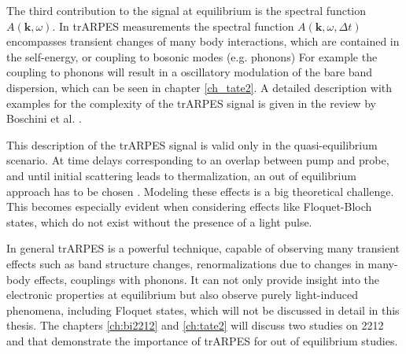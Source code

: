 The third contribution to the signal at equilibrium is the spectral function $A(\mathbf{k}, \omega)$.
In trARPES measurements the spectral function $A(\mathbf{k}, \omega, \Delta t)$ encompasses transient changes of many body interactions, which are contained in the self-energy, or coupling to bosonic modes (e.g. phonons)
For example the coupling to phonons will result in a oscillatory modulation of the bare band dispersion, which can be seen in chapter \ref{ch_tate2}.
A detailed description with examples for the complexity of the trARPES signal is given in the review by Boschini et al. \cite{boschini_time-resolved_2024}.

This description of the trARPES signal is valid only in the quasi-equilibrium scenario.
At time delays corresponding to an overlap between pump and probe, and until initial scattering leads to thermalization, an out of equilibrium approach has to be chosen \cite{schuler_theory_2021, freericks_what_2021,neufeld_time-_2022}.
Modeling these effects is a big theoretical challenge.
This becomes especially evident when considering effects like Floquet-Bloch states, which do not exist without the presence of a light pulse.

In general trARPES is a powerful technique, capable of observing many transient effects such as band structure changes, renormalizations due to changes in many-body effects, couplings with phonons.
It can not only provide insight into the electronic properties at equilibrium but also observe purely light-induced phenomena, including Floquet states, which will not be discussed in detail in this thesis.
The chapters \ref{ch:bi2212} and \ref{ch:tate2} will discuss two studies on 2212 and  that demonstrate the importance of trARPES for out of equilibrium studies.